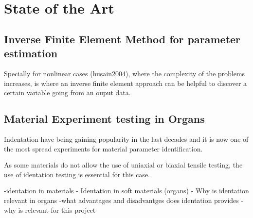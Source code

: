 
\chapter{State of the Art} %

\label{Chapter2} %

\section{Inverse Finite Element Method for parameter estimation}

Specially for nonlinear cases (husain2004), where the complexity of the problems increases, is 
where an inverse finite element approach can be helpful to discover a certain variable 
going from an ouput data.


\section{Material Experiment testing in Organs}

Indentation have being gaining popularity in the last decades and it is now one of
 the most spread experiments for material parameter identification.

As some materials do not allow the use of uniaxial or biaxial tensile testing, the
 use of identation testing is essential for this case. 

-identation in materials
- Identation in soft materials (organs)
- Why is identation relevant in organs
-what advantages and disadvantges does identation provides
-why is relevant for this project 

